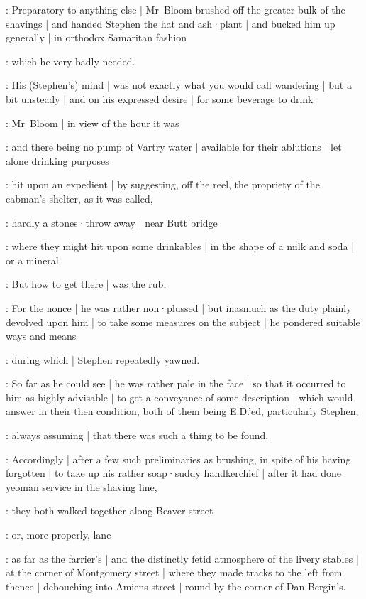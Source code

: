 \newpage


\setcounter{page}{1}

:
Preparatory to anything else |
Mr~Bloom brushed off the greater bulk of the shavings |
and handed Stephen the hat and ash·plant |
and bucked him up generally |
in orthodox Samaritan fashion

:
which he very badly needed.

:
His (Stephen's) mind |
was not exactly what you would call wandering |
but a bit unsteady |
and on his expressed desire |
for some beverage to drink

:
Mr~Bloom |
in view of the hour it was

:
and there being no pump of Vartry water |
available for their ablutions |
let alone drinking purposes

:
hit upon an expedient |
by suggesting,
off the reel,
the propriety of the cabman's shelter,
as it was called,

:
hardly a stones·throw away |
near Butt bridge

:
where they might hit upon some drinkables |
in the shape of a milk and soda |
or a mineral.

:
But how to get there |
was the rub.

:
For the nonce |
he was rather non·plussed |
but inasmuch as the duty plainly devolved upon him |
to take some measures on the subject |
he pondered suitable ways and means

:
during which |
Stephen repeatedly yawned.

:
So far as he could see |
he was rather pale in the face |
so that it occurred to him as highly advisable |
to get a conveyance of some description |
which would answer in their then condition,
both of them being E.D.'ed,
particularly Stephen,

:
always assuming |
that there was such a thing to be found.

:
Accordingly |
after a few such preliminaries as brushing,
in spite of his having forgotten |
to take up his rather soap·suddy handkerchief |
after it had done yeoman service in the shaving line,%

:
they both walked together along Beaver street

:
or, more properly, lane

:
as far as the farrier's |
and the distinctly fetid atmosphere of the livery stables |
at the corner of Montgomery street |
where they made tracks to the left from thence |
debouching into Amiens street |
round by the corner of Dan Bergin's.

